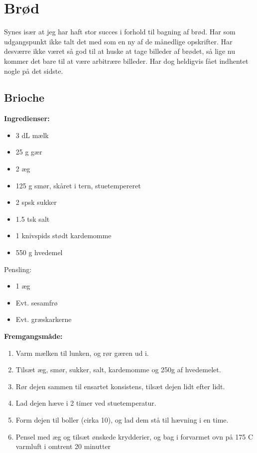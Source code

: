 \documentclass{book}
\begin{document}
\chapter{Brød}
\minitoc
Synes især at jeg har haft stor succes i forhold til bagning af brød. Har som udgangspunkt ikke talt det med som en ny af de månedlige opskrifter. Har desværre ikke været så god til at huske at tage billeder af brødet, så lige nu kommer det bare til at være arbitrære billeder. Har dog heldigvis fået indhentet nogle på det sidste.
\newpage \section{Brioche}
\begin{minipage}[t]{0.5\textwidth}
\textbf{Ingredienser:}
\begin{itemize}
    \item 3 dL mælk
    \item 25 g gær
    \item 2 æg
    \item 125 g smør, skåret i tern, stuetempereret
    \item 2 spsk sukker
    \item 1.5 tsk salt
    \item 1 knivspids stødt kardemomme
    \item 550 g hvedemel
\end{itemize}
Pensling:
\begin{itemize}
    \item 1 æg
    \item Evt. sesamfrø
    \item Evt. græskarkerne
\end{itemize}
\end{minipage}
\begin{minipage}[t]{0.5\textwidth}
\textbf{Fremgangsmåde:}
\begin{enumerate}
    \item Varm mælken til lunken, og rør gæren ud i.
    \item Tilsæt æg, smør, sukker, salt, kardemomme og 250g af hvedemelet.
    \item Rør dejen sammen til ensartet konsistens, tilsæt dejen lidt efter lidt.
    \item Lad dejen hæve i 2 timer ved stuetemperatur.
    \item Form dejen til boller (cirka 10), og lad dem stå til hævning i en time.
    \item Pensel med æg og tilsæt ønskede krydderier, og bag i forvarmet ovn på 175 \degree C varmluft i omtrent 20 minutter
\end{enumerate}
\end{minipage}
\end{document}
